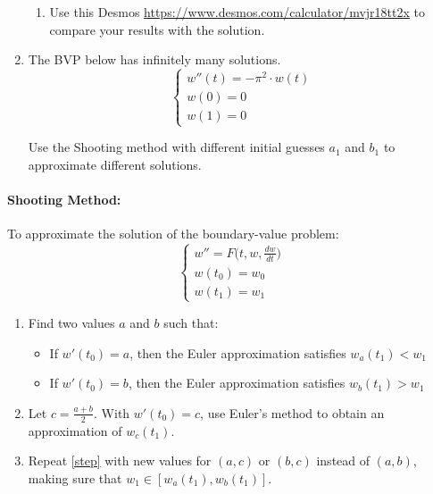 \begin{enumerate}
\begin{enumerate}
		
		
		

		\item Use this Desmos \url{https://www.desmos.com/calculator/mvjr18tt2x} to compare your results with the solution.
	\end{enumerate}


	\item The BVP below has infinitely many solutions.
	\begin{equation}\tag{$\star$}\label{BVP2}
		\begin{cases}
			w''(t) = -\pi^2 \cdot w(t) \\
			w(0) = 0 \\
			w(1) = 0
		\end{cases}
	\end{equation}
	
	Use the Shooting method with different initial guesses $a_1$ and $b_1$ to approximate different solutions.

\end{enumerate}





\vfill



	\paragraph{Shooting Method:}	 To approximate the solution of the boundary-value problem:
	$$
	\begin{cases}
		w'' = F\big(t,w,\tfrac{dw}{dt}\big) \\
		w(t_0)=w_0 \\
		w(t_1)=w_1
	\end{cases}
	$$
	\begin{enumerate}[label={(Step \arabic*)}]
		\item Find two values $a$ and $b$ such that:
		\begin{itemize}
			\item If $w'(t_0)=a$, then the Euler approximation satisfies $w_a(t_1)<w_1$
			\item If $w'(t_0)=b$, then the Euler approximation satisfies $w_b(t_1)>w_1$
		\end{itemize}
	
		\item \label{step}Let $c = \frac{a+b}{2}$. With $w'(t_0)=c$, use Euler's method to obtain an approximation of $w_c(t_1)$.

		\item Repeat \ref{step} with new values for $(a,c)$ or $(b,c)$ instead of $(a,b)$, making sure that $w_1 \in [w_a(t_1), w_b(t_1)]$.
	\end{enumerate}
	
	
	
	
	
	
	
	
	











